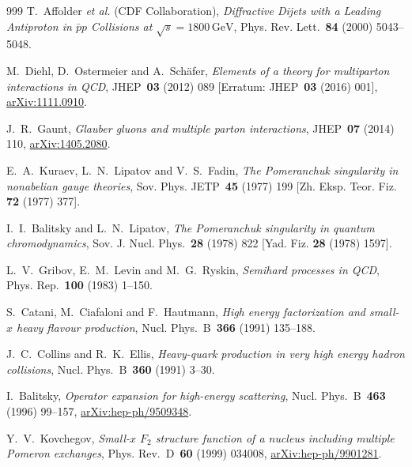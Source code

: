 \begin{thebibliography}{999}
T.~Affolder \emph{et al.} (CDF Collaboration), \emph{Diffractive Dijets with a Leading Antiproton in $\bar{p}p$ Collisions at $\sqrt{s}=1800\,\mathrm{GeV}$}, Phys. Rev. Lett.~\textbf{84} (2000) \mbox{5043--5048}.

M.~Diehl, D.~Ostermeier and A.~Schäfer, \emph{Elements of a theory for multiparton interactions in QCD}, JHEP~\textbf{03} (2012) \mbox{089} [Erratum: JHEP~\textbf{03} (2016) \mbox{001}], \href{https://arxiv.org/abs/1111.0910}{arXiv:1111.0910}.

J.~R.~Gaunt, \emph{Glauber gluons and multiple parton interactions}, JHEP~\textbf{07} (2014) \mbox{110}, \href{https://arxiv.org/abs/1405.2080}{arXiv:1405.2080}.

E.~A.~Kuraev, L.~N.~Lipatov and V.~S.~Fadin, \emph{The Pomeranchuk singularity in nonabelian gauge theories}, Sov. Phys. JETP~\textbf{45} (1977) \mbox{199} [Zh. Eksp. Teor. Fiz. \textbf{72} (1977) \mbox{377}].

I.~I.~Balitsky and L.~N.~Lipatov, \emph{The Pomeranchuk singularity in quantum chromodynamics}, Sov. J. Nucl. Phys.~\textbf{28} (1978) \mbox{822} [Yad. Fiz. \textbf{28} (1978) \mbox{1597}].

L.~V.~Gribov, E.~M.~Levin and M.~G.~Ryskin, \emph{Semihard processes in QCD}, Phys. Rep.~\textbf{100} (1983) \mbox{1--150}.

S.~Catani, M.~Ciafaloni and F.~Hautmann, \emph{High energy factorization and small-$x$ heavy flavour production}, Nucl. Phys.~B~\textbf{366} (1991) \mbox{135--188}.

J.~C.~Collins and R.~K.~Ellis, \emph{Heavy-quark production in very high energy hadron collisions}, Nucl. Phys.~B~\textbf{360} (1991) \mbox{3--30}.

I.~Balitsky, \emph{Operator expansion for high-energy scattering}, Nucl. Phys.~B~\textbf{463} (1996) \mbox{99--157}, \href{https://arxiv.org/abs/hep-ph/9509348}{arXiv:hep-ph/9509348}.

Y.~V.~Kovchegov, \emph{Small-$x$ $F_2$ structure function of a nucleus including multiple Pomeron exchanges}, Phys. Rev.~D~\textbf{60} (1999) \mbox{034008}, \href{https://arxiv.org/abs/hep-ph/9901281}{arXiv:hep-ph/9901281}.


\end{thebibliography}
